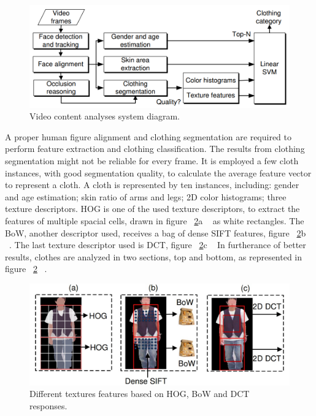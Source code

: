 \documentclass[titlepage,12pt,a4paper,times]{book}
\begin{document}
\begin{figure}[!h]
\centering
\includegraphics[scale=0.5]{images/Clothing_Diagram_1.png}
\caption{Video content analyses system diagram.}
\label{fig:vcasd}
\end{figure}
\FloatBarrier

A proper human figure alignment and clothing segmentation are required to
perform feature extraction and clothing classification. The results from
clothing segmentation might not be reliable for every frame. It is employed a
few cloth instances, with good segmentation quality, to calculate the average
feature vector to represent a cloth. A cloth is represented by ten instances,
including: gender and age estimation; skin ratio of arms and legs; 2D color
histograms; three texture descriptors.
\ac{HOG} is one of the used texture descriptors, to extract the features of
multiple spacial cells, drawn in figure ~\ref{fig:dtf}a ~\citep{1} as white
rectangles. The \ac{BoW}, another descriptor used, receives a bag of dense
\ac{SIFT} features, figure ~\ref{fig:dtf}b ~\citep{1}. The last texture descriptor
used is \ac{DCT}, figure ~\ref{fig:dtf}c ~\citep{1} In furtherance of better
results, clothes are analyzed in two sections, top and bottom, as represented
in figure ~\ref{fig:dtf} ~\citep{1}.

\begin{figure}[!h]
\centering
\includegraphics[scale=0.3]{images/top_bottom.jpg}
\caption{Different textures features based on \ac{HOG}, \ac{BoW} and
\acs{DCT} responses.}
\label{fig:dtf}
\end{figure}
\FloatBarrier
\end{document}
